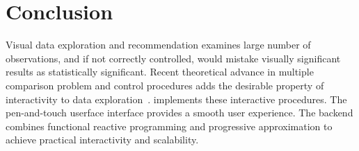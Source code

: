 \section{Conclusion}
\label{sec:conclusion}
Visual data exploration and recommendation examines large number of observations, and if not correctly controlled, would mistake visually significant results as statistically significant.  Recent theoretical advance in multiple comparison problem and control procedures adds the desirable property of interactivity to data exploration~\cite{zhao2016controlling}.  \system{} implements these interactive procedures. The pen-and-touch userface interface provides a smooth user experience.  The \system{} backend combines functional reactive programming and progressive approximation to achieve practical interactivity and scalability.